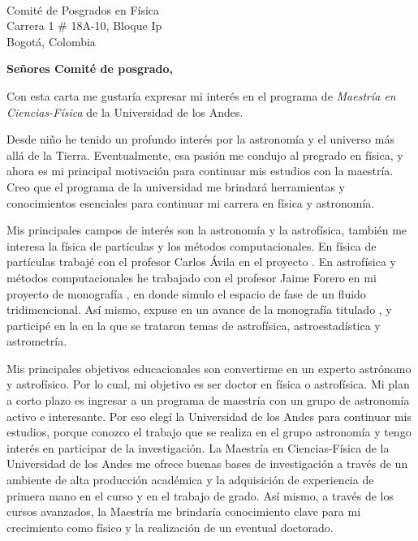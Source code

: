\documentclass[10pt]{letter} %
\begin{document}

\begin{letter}{\\ Comité de Posgrados en Física \\ Carrera 1 \# 18A-10, Bloque Ip \\ Bogotá, Colombia} %


\opening{\textbf{Señores Comité de posgrado,}}
Con esta carta me gustaría expresar mi interés en el programa de \emph{Maestría en Ciencias-Física} de la Universidad de los Andes.

Desde niño he tenido un profundo interés por la astronomía y el universo más allá de la Tierra. Eventualmente, esa pasión me condujo al pregrado en física, y ahora es mi principal motivación para continuar mis estudios con la maestría. Creo que el programa de la universidad me brindará herramientas y conocimientos esenciales para continuar mi carrera en física y astronomía.

Mis principales campos de interés son la astronomía y la astrofísica, también me interesa la física de partículas y los métodos computacionales. En física de partículas trabajé con el profesor Carlos Ávila en el proyecto . En astrofísica y métodos computacionales he trabajado con el profesor Jaime Forero en mi proyecto de monografía , en donde simulo el espacio de fase de un fluido tridimencional. Así mismo, expuse en  un avance de la monografía titulado , y participé en la  en la que se trataron temas de astrofísica, astroestadística y astrometría.

Mis principales objetivos educacionales son convertirme en un experto astrónomo y astrofísico. Por lo cual, mi objetivo es ser doctor en física o astrofísica. Mi plan a corto plazo es ingresar a un programa de maestría con un grupo de astronomía activo e interesante. Por eso elegí la Universidad de los Andes para continuar mis estudios, porque conozco el trabajo que se realiza en el grupo astronomía y tengo interés en participar de la investigación. La Maestría en Ciencias-Física de la Universidad de los Andes me ofrece buenas bases de investigación a través de un ambiente de alta producción académica y la adquisición de experiencia de primera mano en el curso  y en el trabajo de grado. Así mismo, a través de los cursos avanzados, la Maestría me brindaría conocimiento clave para mi crecimiento como físico y la realización de un eventual doctorado.


\end{letter}
\end{document}
